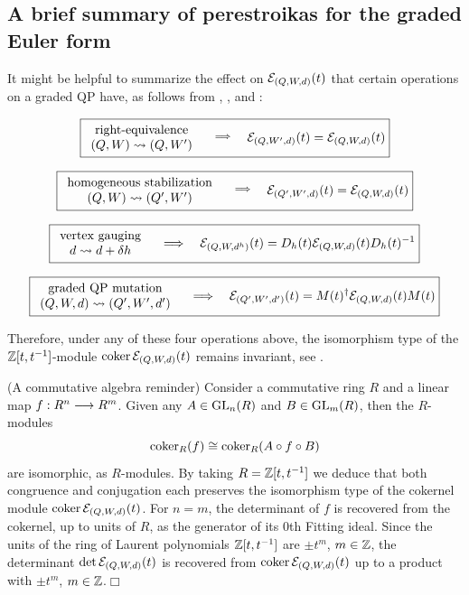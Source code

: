 \subsection{A brief summary of perestroikas for the graded Euler form}\label{sec:euler-summary} It might be helpful to summarize the effect on $\mathcal E_{(Q,W,d)}(t)$ that certain operations on a graded QP have, as follows from , ,  and :

\[
\boxed{
\begin{array}{c}
\text{right-equivalence}\\
(Q,W)\rightsquigarrow (Q,W')
\end{array}
\quad\stackrel\Longrightarrow\quad
\quad\mathcal E_{(Q,W',d)}(t)= \mathcal E_{(Q,W,d)}(t)
}
\]

\[
\boxed{
\begin{array}{c}
\text{homogeneous stabilization}\\
(Q,W)\rightsquigarrow (Q',W')
\end{array}
\quad\stackrel\Longrightarrow\quad
\quad\mathcal E_{(Q',W',d)}(t)= \mathcal E_{(Q,W,d)}(t)
}
\]

\[
\boxed{
\begin{array}{c}
\text{vertex gauging}\\
d\rightsquigarrow d+\delta h
\end{array}
\quad\Longrightarrow\quad
\mathcal E_{(Q,W,d^h)}(t)= D_h(t)\mathcal E_{(Q,W,d)}(t)D_h(t)^{-1}
}
\]

\[
\boxed{
\begin{array}{c}
\text{graded QP mutation}\\
(Q,W,d)\rightsquigarrow(Q',W',d')
\end{array}
\quad\Longrightarrow\quad
\mathcal E_{(Q',W',d')}(t)= M(t)^\dagger \mathcal E_{(Q,W,d)}(t)M(t)
}
\]

\noindent Therefore, under any of these four operations above, the isomorphism type of the $\mathbb Z[t,t^{-1}]$-module $\operatorname{coker}\mathcal E_{(Q,W,d)}(t)$ remains invariant, see .

\begin{remark}\label{rmk:linear_algebra} (A commutative algebra reminder) Consider a commutative ring $R$ and a linear map $f:R^n\longrightarrow R^m$. Given any $A\in\operatorname{GL}_n(R)$ and $B\in\operatorname{GL}_m(R)$, then the $R$-modules
$$\operatorname{coker}_R(f)\cong \operatorname{coker}_R(A\circ f\circ B)$$
are isomorphic, as $R$-modules. By taking $R=\mathbb Z[t,t^{-1}]$ we deduce that both congruence and conjugation each preserves the isomorphism type of the cokernel module $\operatorname{coker}\mathcal E_{(Q,W,d)}(t)$. For $n=m$, the determinant of $f$ is recovered from the cokernel, up to units of $R$, as the generator of its $0$th Fitting ideal. Since the units of the ring of Laurent polynomials $\mathbb Z[t,t^{-1}]$ are $\pm t^{m}$, $m\in\mathbb Z$, the determinant $\det\mathcal E_{(Q,W,d)}(t)$ is recovered from $\operatorname{coker}\mathcal E_{(Q,W,d)}(t)$ up to a product with $\pm t^{m}$, $m\in\mathbb Z$.\hfill$\Box$
\end{remark}

